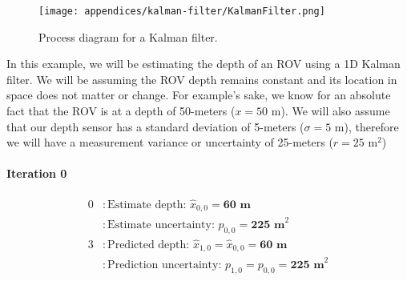 \begin{figure}[h!]
    \texttt{[image: appendices/kalman-filter/KalmanFilter.png]}
    \caption[Kalman Filter Diagram]{Process diagram for a Kalman filter.}
    \label{fig:kalman_filter_process}
\end{figure}

\begin{fitbox}[frametitle=Example]
    In this example, we will be estimating the depth of an ROV using a 1D Kalman filter.
    We will be assuming the ROV depth remains constant and its location in space does not matter or change.
    For example's sake, we know for an absolute fact that the ROV is at a depth of 50-meters ($x=50 \text{ m}$).
    We will also assume that our depth sensor has a standard deviation of 5-meters ($\sigma=5 \text{ m}$), therefore we will have a measurement variance or uncertainty of 25-meters ($r=25 \text{ m}^2$)

    \paragraph*{Iteration 0}
    \begin{equation*}
        \begin{aligned}
            0 &: \text{Estimate depth: } \hat{x}_{0,0} = \textbf{60 m} \\
                &: \text{Estimate uncertainty: } p_{0,0} = \textbf{225 m}^2 \\
            3 &: \text{Predicted depth: } \hat{x}_{1,0} = \hat{x}_{0,0} = \textbf{60 m} \\
                &: \text{Prediction uncertainty: } p_{1,0} = p_{0,0} = \textbf{225 m}^2 \\
        \end{aligned}
    \end{equation*}


\end{fitbox}
